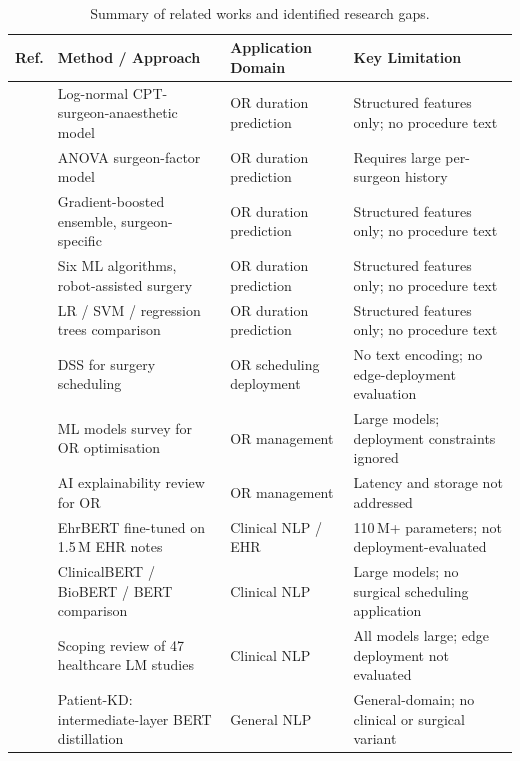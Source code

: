 \documentclass[3p]{elsarticle}
\begin{document}
\begin{table}[ht]
\centering
\fontsize{9.5}{11}\selectfont
\caption{\\Summary of related works and identified research gaps.}
\label{tab:related_summary}
\begin{threeparttable}
\begin{tabularx}{\linewidth}{@{}lXlX@{}}
\toprule
Ref. & Method / Approach & Application Domain & Key Limitation \\
\midrule
\cite{stepaniak2009modeling} & Log-normal CPT-surgeon-anaesthetic model & OR duration prediction & Structured features only; no procedure text \\
\cite{stepaniak2010modeling} & ANOVA surgeon-factor model & OR duration prediction & Requires large per-surgeon history \\
\cite{bartek2019improving}   & Gradient-boosted ensemble, surgeon-specific & OR duration prediction & Structured features only; no procedure text \\
\cite{zhao2019machine}       & Six ML algorithms, robot-assisted surgery & OR duration prediction & Structured features only; no procedure text \\
\cite{martinez2021machine}   & LR / SVM / regression trees comparison & OR duration prediction & Structured features only; no procedure text \\
\cite{dios2015decision}      & DSS for surgery scheduling & OR scheduling deployment & No text encoding; no edge-deployment evaluation \\
\cite{bellini2020artificial} & ML models survey for OR optimisation & OR management & Large models; deployment constraints ignored \\
\cite{bellini2024artificial} & AI explainability review for OR & OR management & Latency and storage not addressed \\
\cite{li2019fine}            & EhrBERT fine-tuned on 1.5\,M EHR notes & Clinical NLP / EHR & 110\,M+ parameters; not deployment-evaluated \\
\cite{turchin2023comparison} & ClinicalBERT / BioBERT / BERT comparison & Clinical NLP & Large models; no surgical scheduling application \\
\cite{nunes2024health}       & Scoping review of 47 healthcare LM studies & Clinical NLP & All models large; edge deployment not evaluated \\
\cite{sun2019patient}        & Patient-KD: intermediate-layer BERT distillation & General NLP & General-domain; no clinical or surgical variant \\

\end{tabularx}
\end{threeparttable}
\end{table}
\end{document}
